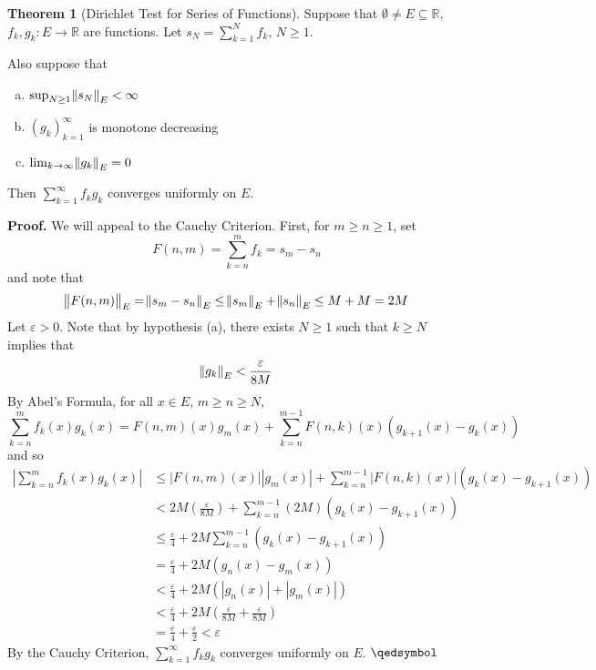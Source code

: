 \documentclass[11pt]{article}
\theoremstyle{definition}
\newtheorem{thm}{Theorem}[section]
\newcommand{\mbR}{\ensuremath{\mathbb{R}}}
\begin{document}
\begin{thm}[Dirichlet Test for Series of Functions]
Suppose that $\emptyset \ne E \subseteq \mbR$, $f_k, g_k : E \to \mbR$ are functions. Let $s_N = \sum_{k=1}^N f_k$, $N \geq 1$. 

Also suppose that
\begin{enumerate}[(a)] \vspace{-0.2cm}
\item $\sup_{N\geq1} \norm{s_N}_E < \infty$
\item $(g_k)_{k=1}^\infty$ is monotone decreasing
\item $\lim_{k\to\infty} \norm{g_k}_E = 0$
\end{enumerate}
Then $\sum_{k=1}^\infty f_k g_k$ converges uniformly on $E$.
\end{thm}
\textbf{Proof.} We will appeal to the Cauchy Criterion. First, for $m \geq n \geq 1$, set
$$F(n, m) = \sum_{k=n}^m f_k = s_m - s_n$$
and note that 
$$\norm{F(n, m)}_E = \norm{s_m - s_n}_E \leq \norm{s_m}_E + \norm{s_n}_E \leq M + M = 2M$$
Let $\varepsilon > 0$. Note that by hypothesis (a), there exists $N \geq 1$ such that $k \geq N$ implies that
$$\norm{g_k}_E < \frac{\varepsilon}{8M}$$
By Abel's Formula, for all $x \in E$, $m \geq n \geq N$, 
$$\sum_{k=n}^m f_k(x) g_k(x) = F(n, m)(x) g_m(x) + \sum_{k=n}^{m-1} F(n, k)(x) \left(g_{k+1}(x) - g_k(x)\right)$$
and so
\begin{align*}
\left| \sum_{k=n}^m f_k(x) g_k(x) \right| & \leq |F(n, m)(x)||g_m(x)| + \sum_{k=n}^{m-1} |F(n, k)(x)| \left(g_k(x) - g_{k+1}(x)\right) \\
& < 2M \left( \frac{\varepsilon}{8M} \right) + \sum_{k=n}^{m-1} (2M) \left(g_k(x) - g_{k+1}(x) \right) \\
& \leq \frac{\varepsilon}4 + 2M \sum_{k=n}^{m-1} \left( g_k(x) - g_{k+1}(x) \right) \\
& = \frac{\varepsilon}4 + 2M\left( g_n(x) - g_m(x) \right) \\
& < \frac{\varepsilon}4 + 2M \left( |g_n(x)| + |g_m(x)| \right) \\
& < \frac{\varepsilon}4 + 2M \left( \frac{\varepsilon}{8M} + \frac{\varepsilon}{8M} \right) \\
& = \frac{\varepsilon}4 + \frac{\varepsilon}2 < \varepsilon
\end{align*}
By the Cauchy Criterion, $\sum_{k=1}^\infty f_k g_k$ converges uniformly on $E$. $\qedsymbol$
\end{document}
